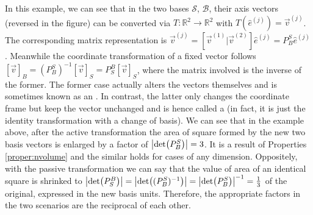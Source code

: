 \begin{solution}
\begin{figure}
\end{figure}
\end{solution}
In this example, we can see that in the two bases $\mathcal{S}$, $\mathcal{B}$, their axis vectors (reversed in the figure) can be converted via $T: \mathbb{R}^2 \to \mathbb{R}^2$ with $T(\hat{e}^{(j)}) = \vec{v}^{(j)}$. The corresponding matrix representation is $\vec{v}^{(j)} = [\vec{v}^{(1)}|\vec{v}^{(2)}]\hat{e}^{(j)} = P_B^S\hat{e}^{(j)}$. Meanwhile the coordinate transformation of a fixed vector follows $[\vec{v}]_B = (P_B^S)^{-1}[\vec{v}]_S = P_S^B[\vec{v}]_S$, where the matrix involved is the inverse of the former. The former case actually alters the vectors themselves and is sometimes known as an . In contrast, the latter only changes the coordinate frame but keep the vector unchanged and is hence called a  (in fact, it is just the identity transformation with a change of basis). We can see that in the example above, after the active transformation the area of square formed by the new two basis vectors is enlarged by a factor of $\abs{\det(P_B^S)}=3$. It is a result of Properties \ref{proper:nvolume} and the similar holds for cases of any dimension. Oppositely, with the passive transformation we can say that the value of area of an identical square is shrinked to $\abs{\det(P_S^B)} = \abs{\det((P_B^S)^{-1})} = \abs{\det(P_B^S)}^{-1} = \frac{1}{3}$ of the original, expressed in the new basis units. Therefore, the appropriate factors in the two scenarios are the reciprocal of each other.

